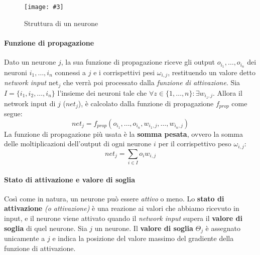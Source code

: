 \documentclass[12pt, twoside, letterpaper]{report}
\newcommand{\img}[4] {
	\begin{figure}
		\caption{#1}
		\centering
		\texttt{[image: \#3]}\\
		\label{#4}
	\end{figure}
}
\begin{document}
			\img{Struttura di un neurone}{0.4}{neurone.png}{neurone}
			
			 \paragraph{Funzione di propagazione} Dato un neurone $j$, la sua funzione di propagazione riceve gli output $o_{i_1}, \dots, o_{i_n}$ dei neuroni $i_1, \dots, i_n$ connessi a $j$ e i corrispettivi pesi $\omega_{i,j}$, restituendo un valore detto \textit{network input} net$_j$ che verrà poi processato dalla \textit{funzione di attivazione}. 
			 	Sia $I = \{i_1, i_2, \dots, i_n\}$ l'insieme dei neuroni tale che $\forall z \in \{1, \dots, n\} : \exists w_{i_z,j}$. Allora il network input di $j$ ($net_j$), è calcolato dalla funzione di propagazione $f_{prop}$ come segue: $$net_j = f_{prop}(o_{i_1}, \dots, o_{i_n},w_{i_1,j}, \dots, w_{i_n,j})$$
			 	La funzione di propagazione più usata è la \textbf{somma pesata}, ovvero la somma delle moltiplicazioni dell'output di ogni neurone $i$ per il corrispettivo peso $\omega_{i,j}$: $$net_j = \sum_{i \in I} o_i w_{i,j}$$
			 	
			 \paragraph{Stato di attivazione e valore di soglia} Così come in natura, un neurone può essere \textit{attivo} o meno. Lo \textbf{stato di attivazione} \textit{(o attivazione)} è una reazione ai valori che abbiamo ricevuto in input, e il neurone viene attivato quando il \textit{network input} supera il \textbf{valore di soglia} di quel neurone. Sia $j$ un neurone. Il \textbf{valore di soglia} $\Theta_j$ è assegnato unicamente a $j$ e indica la posizione del valore massimo del gradiente della funzione di attivazione.
			 
			 
\end{document}
